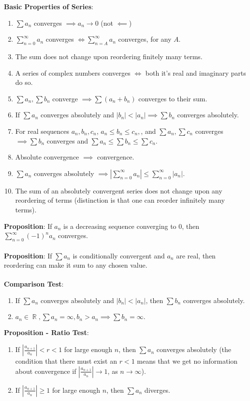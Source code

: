 \documentclass{article}
\DeclareMathOperator{\R}{\mathbb{R}}
\begin{document}
\textbf{Basic Properties of Series}: \begin{enumerate}
    \item $\sum a_n$ converges $\implies a_n \rightarrow 0$ (not $\impliedby$)
    \item $\sum_{n = 0}^\infty a_n$ converges $\iff \sum_{n = A}^\infty a_n$ converges, for any $A$.
    \item The sum does not change upon reordering finitely many terms.
    \item A series of complex numbers converges $\iff$ both it's real and imaginary parts do so.
    \item $\sum a_n, \sum b_n$ converge $\implies \sum (a_n + b_n)$ converges to their sum.
    \item If $\sum a_n$ converges absolutely and $|b_n| < |a_n| \implies \sum b_n$ converges absolutely.
    \item For real sequences $a_n, b_n, c_n$, $a_n \leq b_n \leq c_n,$, and $\sum a_n, \sum c_n$ converges $\implies \sum b_n$ converges and $\sum a_n \leq \sum b_n \leq \sum c_n.$
    \item Absolute convergence $\implies$ convergence.
    \item $\sum a_n$ converges absolutely $\implies |\sum_{n = 0}^\infty a_n| \leq \sum_{n = 0}^\infty |a_n|$.
    \item The sum of an absolutely convergent series does not change upon any reordering of terms (distinction is that one can reorder infinitely many terms).
\end{enumerate} $ $ \\
\textbf{Proposition}: If $a_n$ is a decreasing sequence converging to 0, then $\sum_{n = 0}^\infty (-1)^n a_n$ converges. \\ \\
\textbf{Proposition}: If $\sum a_n$ is conditionally convergent and $a_n$ are real, then reordering can make it sum to any chosen value. \\ \\
\textbf{Comparison Test}: \begin{enumerate}
    \item If $\sum a_n$ converges absolutely and $|b_n| < |a_n|$, then $\sum b_n$ converges absolutely.
    \item $a_n \in \R, \sum a_n = \infty, b_n > a_n \implies \sum b_n = \infty.$
\end{enumerate} $ $ \\
\textbf{Proposition - Ratio Test}: \begin{enumerate}
    \item If $\left| \frac{a_{n + 1}}{a_n}\right| < r < 1$ for large enough $n$, then $\sum a_n$ converges absolutely (the condition that there must exist an $r < 1$ means that we get no information about convergence if $\left| \frac{a_{n + 1}}{a_n}\right| \rightarrow 1$, as $n \rightarrow \infty$).
    \item If $\left| \frac{a_{n + 1}}{a_n}\right| \geq 1$ for large enough $n$, then $\sum a_n$ diverges.
\end{enumerate} $ $ \\
\end{document}
